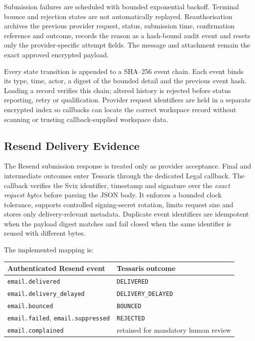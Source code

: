 Submission failures are scheduled with bounded exponential backoff.  Terminal
bounce and rejection states are not automatically replayed.  Reauthorisation
archives the previous provider request, status, submission time, confirmation
reference and outcome, records the reason as a hash-bound audit event and resets
only the provider-specific attempt fields.  The message and attachment remain
the exact approved encrypted payload.

Every state transition is appended to a SHA--256 event chain.  Each event binds
its type, time, actor, a digest of the bounded detail and the previous event
hash.  Loading a record verifies this chain; altered history is rejected before
status reporting, retry or qualification.  Provider request identifiers are
held in a separate encrypted index so callbacks can locate the correct
workspace record without scanning or trusting callback-supplied workspace data.

\subsection{Resend Delivery Evidence}

The Resend submission response is treated only as provider acceptance.  Final
and intermediate outcomes enter Tessaris through the dedicated Legal callback.
The callback verifies the Svix identifier, timestamp and signature over the
\emph{exact request bytes} before parsing the JSON body.  It enforces a bounded
clock tolerance, supports controlled signing-secret rotation, limits request
size and stores only delivery-relevant metadata.  Duplicate event identifiers
are idempotent when the payload digest matches and fail closed when the same
identifier is reused with different bytes.

The implemented mapping is:

\begin{center}
\begin{tabular}{@{}ll@{}}
\toprule
\textbf{Authenticated Resend event} & \textbf{Tessaris outcome} \\
\midrule
\texttt{email.delivered} & \texttt{DELIVERED} \\
\texttt{email.delivery\_delayed} & \texttt{DELIVERY\_DELAYED} \\
\texttt{email.bounced} & \texttt{BOUNCED} \\
\texttt{email.failed}, \texttt{email.suppressed} & \texttt{REJECTED} \\
\texttt{email.complained} & retained for mandatory human review \\
\bottomrule
\end{tabular}
\end{center}


